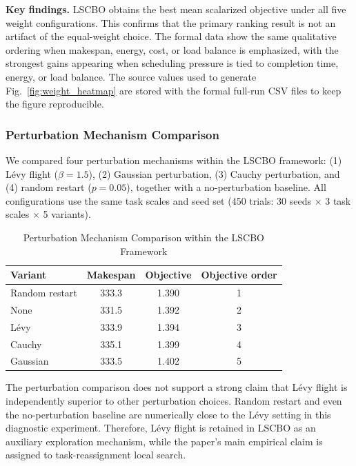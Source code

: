 \documentclass[pdflatex,onecolumn,sn-mathphys-num]{sn-jnl}
\begin{document}
\textbf{Key findings.} LSCBO obtains the best mean scalarized objective under all five weight configurations. This confirms that the primary ranking result is not an artifact of the equal-weight choice. The formal data show the same qualitative ordering when makespan, energy, cost, or load balance is emphasized, with the strongest gains appearing when scheduling pressure is tied to completion time, energy, or load balance. The source values used to generate Fig.~\ref{fig:weight_heatmap} are stored with the formal full-run CSV files to keep the figure reproducible.

\subsubsection{Perturbation Mechanism Comparison}\label{sec:perturbation}
We compared four perturbation mechanisms within the LSCBO framework: (1) L\'{e}vy flight ($\beta=1.5$), (2) Gaussian perturbation, (3) Cauchy perturbation, and (4) random restart ($p=0.05$), together with a no-perturbation baseline. All configurations use the same task scales and seed set (450 trials: 30 seeds $\times$ 3 task scales $\times$ 5 variants).

\begin{table}[ht]
\centering
\caption{Perturbation Mechanism Comparison within the LSCBO Framework}\label{tab:perturbation}
\begin{tabular}{l c c c}
\toprule
\textbf{Variant} & \textbf{Makespan} & \textbf{Objective} & \textbf{Objective order} \\
\midrule
Random restart & 333.3 & 1.390 & 1 \\
None & 331.5 & 1.392 & 2 \\
L\'{e}vy & 333.9 & 1.394 & 3 \\
Cauchy & 335.1 & 1.399 & 4 \\
Gaussian & 333.5 & 1.402 & 5 \\
\bottomrule
\end{tabular}
\end{table}

The perturbation comparison does not support a strong claim that L\'{e}vy flight is independently superior to other perturbation choices. Random restart and even the no-perturbation baseline are numerically close to the L\'{e}vy setting in this diagnostic experiment. Therefore, L\'{e}vy flight is retained in LSCBO as an auxiliary exploration mechanism, while the paper's main empirical claim is assigned to task-reassignment local search.
\end{document}
